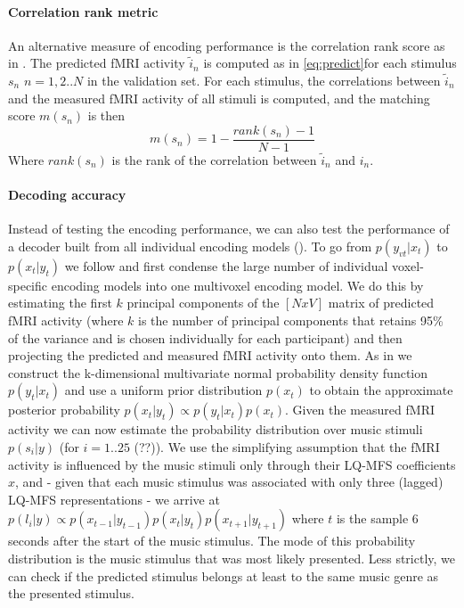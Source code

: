 \paragraph{Correlation rank metric}
An alternative measure of encoding performance is the correlation rank score as in \cite{SF14}. The predicted f{MRI} activity $\widetilde{i}_{n}$ is computed as in \ref{eq:predict}for each stimulus $s_{n}$ $n=1,2..N$  in the validation set.
For each stimulus, the correlations between $\widetilde{i}_{n}$ and the measured f{MRI} activity of all stimuli is computed, and the matching score $m(s_{n})$ is then
\[ m(s_{n}) = 1-\frac{rank(s_{n})-1}{N-1} \]
Where $rank(s_{n})$ is the rank of the correlation between $\widetilde{i}_{n}$ and $i_{n}$.

\paragraph{Decoding accuracy}

Instead of testing the encoding performance, we can also test the performance of a decoder built from all individual encoding models (\cite{NG11}). To go from $p(y_{vt}|x_{t})$ to $p(x_{t}|y_{t})$ we follow \cite{NG09} and first condense the large number of individual voxel-specific encoding models into one multivoxel encoding model. We do this by estimating the first $k$ principal components of the $[N x V]$ matrix of predicted f{MRI} activity (where $k$ is the number of principal components that retains 95\% of the variance and is chosen individually for each participant) and then projecting the predicted and measured f{MRI} activity onto them. As in \cite{NG09} we construct the k-dimensional multivariate normal probability density function $p(y_{t}|x_{t})$ and use a uniform prior distribution $p(x_{t})$ to obtain the approximate posterior probability $p(x_{t}|y_{t}) \propto p(y_{t}|x_{t})p(x_{t})$. Given the measured f{MRI} activity we can now estimate the probability distribution over music stimuli $p(s_{i}|y)$ (for $i=1..25$ (??)). We use the simplifying assumption that the f{MRI} activity is influenced by the music stimuli only through their LQ-MFS coefficients $x$, and - given that each music stimulus was associated with only three (lagged) LQ-MFS representations - we arrive at $p(l_{i}|y) \propto p(x_{t-1}|y_{t-1})p(x_{t}|y_{t})p(x_{t+1}|y_{t+1})$ where $t$ is the sample 6 seconds after the start of the music stimulus. The mode of this probability distribution is the music stimulus that was most likely presented. Less strictly, we can check if the predicted stimulus belongs at least to the same music genre as the presented stimulus. 



